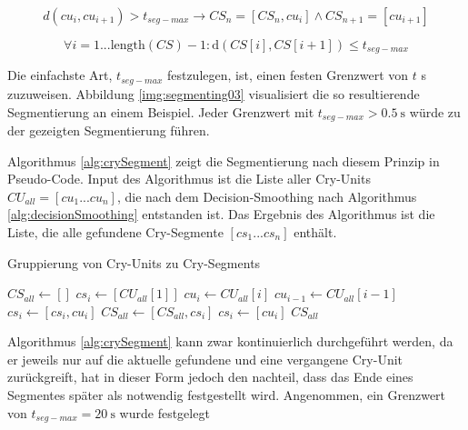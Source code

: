 \begin{equation}
d(cu_i, cu_{i+1}) > t_{seg-max} \rightarrow CS_{n} =[CS_n, cu_i] \wedge CS_{n+1} = [cu_{i+1}]  
\label{eq:cry-segment-constraint1}
\end{equation}

\begin{equation}
\forall i = 1 ... \text{length}(CS)-1: \text{d}(CS[i], CS[i+1]) \leq t_{seg-max}
\label{eq:cry-segment-constraint2}
\end{equation}

Die einfachste Art, $t_{seg-max}$ festzulegen, ist, einen festen Grenzwert von $t$ s zuzuweisen. Abbildung \ref{img:segmenting03} visualisiert die so resultierende Segmentierung an einem Beispiel. Jeder Grenzwert mit $t_{seg-max} > \SI{0.5}{\second}$ würde zu der gezeigten Segmentierung führen. 

Algorithmus \ref{alg:crySegment} zeigt die Segmentierung nach diesem Prinzip in Pseudo-Code. Input des Algorithmus ist die Liste aller Cry-Units $CU_{all} = [cu_1 ... cu_n]$, die nach dem Decision-Smoothing nach Algorithmus \ref{alg:decisionSmoothing} entstanden ist.  Das Ergebnis des Algorithmus ist die Liste, die alle gefundene Cry-Segmente  $[cs_1 ...  cs_n]$ enthält. 

\begin{algorithm}[H]
	\caption{Gruppierung von Cry-Units zu Cry-Segments}
	\label{alg:crySegment}
	\begin{algorithmic}[1]
		\State $ CS_{all} \gets []$
		\State $ cs_i \gets [CU_{all}[1]]$
		\State $ cu_i \gets CU_{all}[i]$
		\State $cu_{i-1} \gets CU_{all}[i-1]$
		\State $cs_i \gets [cs_i , cu_i]$
		\Else
		\State $CS_{all} \gets [CS_{all}, cs_i]$
		\State $cs_i \gets [cu_i]$
		\EndIf
		\EndFor
		\Return $CS_{all}$
		
		\EndFunction
		
	\end{algorithmic}
\end{algorithm}

Algorithmus  \ref{alg:crySegment} kann zwar kontinuierlich durchgeführt werden, da er jeweils nur auf die aktuelle gefundene und eine vergangene Cry-Unit zurückgreift, hat in dieser Form jedoch den nachteil, dass das Ende eines Segmentes später als notwendig festgestellt wird. Angenommen, ein Grenzwert von $t_{seg-max} = \SI{20}{\second}$ wurde festgelegt



